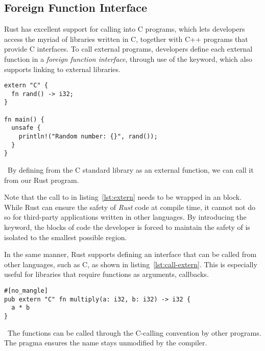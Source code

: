 
\subsection{Foreign Function Interface}\label{sec:ffi}

Rust has excellent support for calling into C programs, which lets developers
access the myriad of libraries written in C, together with C++ programs that
provide C interfaces. To call external programs, developers define each external
function in a \textit{foreign function
interface}, through
use of the  keyword, which also supports linking to external
libraries.

\begin{listing}[H]
  \begin{verbatim}
extern "C" {
  fn rand() -> i32;
}

fn main() {
  unsafe {
    println!("Random number: {}", rand());
  }
}
  \end{verbatim}
  \caption{\
    By defining  from the C standard library as an external function,
    we can call it from our Rust program.
  }\label{lst:extern}
\end{listing}

Note that the call to  in listing~\ref{lst:extern} needs
to be wrapped in an \code{unsafe} block. While Rust can ensure the safety of
\textit{Rust} code at compile time, it cannot not do so for third-party
applications written in other languages. By introducing the 
keyword, the blocks of code the developer is forced to maintain the safety of is
isolated to the smallest possible region.

In the same manner, Rust supports defining an interface that can be called from
other languages, such as C, as shown in listing~\ref{lst:call-extern}. This is
especially useful for libraries that require functions as arguments, \eg callbacks.

\begin{listing}[H]
  \begin{verbatim}
#[no_mangle]
pub extern "C" fn multiply(a: i32, b: i32) -> i32 {
  a * b
}
  \end{verbatim}
  \caption{\
    The  functions can be called through the C-calling convention
    by other programs. The  pragma ensures the 
    name stays unmodified by the compiler.
  }\label{lst:call-extern}
\end{listing}

